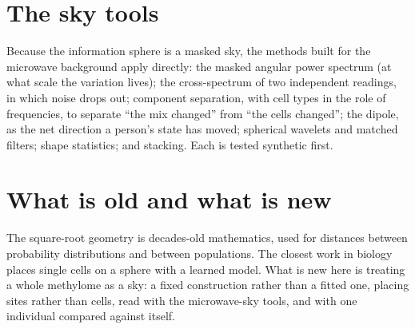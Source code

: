 \section{The sky tools}

Because the information sphere is a masked sky, the methods built for the microwave background apply directly: the masked angular power
spectrum (at what scale the variation lives); the cross-spectrum of two independent readings, in which noise drops out; component
separation, with cell types in the role of frequencies, to separate ``the mix changed'' from ``the cells changed''; the dipole, as the net
direction a person's state has moved; spherical wavelets and matched filters; shape statistics; and stacking. Each is tested synthetic
first.

\section{What is old and what is new}

The square-root geometry is decades-old mathematics, used for distances between probability distributions and between populations. The
closest work in biology places single cells on a sphere with a learned model. What is new here is treating a whole methylome as a sky: a
fixed construction rather than a fitted one, placing sites rather than cells, read with the microwave-sky tools, and with one individual
compared against itself.
